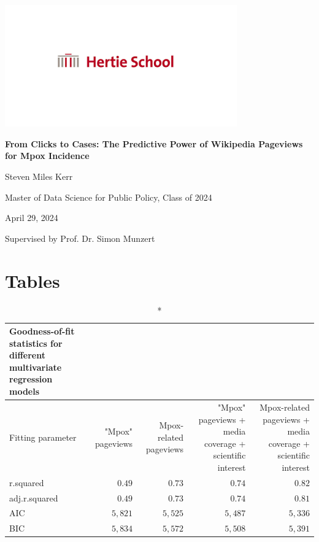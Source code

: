 \documentclass[
  12pt,
]{article}
\author{Steven Miles Kerr}
\date{29 April 2024}
\begin{document}
\begin{titlepage}
    \centering
    \includegraphics[width=0.75\textwidth]{images/hertie-school-logo.jpg}
    \vspace*{\fill}
    
    \textbf{From Clicks to Cases: The Predictive Power of Wikipedia Pageviews for Mpox Incidence}

    \vspace{2.5cm}

    Steven Miles Kerr

    \vspace{1cm}
    
    Master of Data Science for Public Policy, Class of 2024\\
    
    \vspace{0.5cm}

    April 29, 2024\\

    \vspace*{\fill}

    Supervised by Prof. Dr. Simon Munzert

\end{titlepage}

\tableofcontents
\thispagestyle{empty}
\newpage

\setcounter{page}{1}

\section{Tables}\label{tables}

\begin{longtable*}{lrrrr}
\caption*{
{\large Goodness-of-fit statistics for different multivariate regression models}
} \\ 
\toprule
Fitting parameter & "Mpox" pageviews & Mpox-related pageviews & "Mpox" pageviews + media coverage + scientific interest & Mpox-related pageviews + media coverage + scientific interest \\ 
\midrule\addlinespace[2.5pt]
r.squared & $0.49$ & $0.73$ & $0.74$ & $0.82$ \\ 
adj.r.squared & $0.49$ & $0.73$ & $0.74$ & $0.81$ \\ 
AIC & $5,821$ & $5,525$ & $5,487$ & $5,336$ \\ 
BIC & $5,834$ & $5,572$ & $5,508$ & $5,391$ \\ 
\bottomrule
\end{longtable*}
\end{document}
